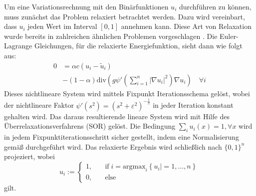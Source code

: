 Um eine Variationsrechnung mit den Binärfunktionen $u_i$ durchführen zu können, muss zunächst das Problem relaxiert
betrachtet werden. Dazu wird vereinbart, dass $u_i$ jeden Wert im Interval $[0,1]$ annehmen kann. Diese Art von Relaxation wurde bereits in zahlreichen
ähnlichen Problemen vorgeschlagen \cite{008,018,014}. Die Euler-Lagrange Gleichungen, für die relaxierte Energiefunktion, sieht dann wie folgt aus:
\begin{equation}
  \begin{split}
    0 & = \alpha c (u_i - \tilde u_i) \\
    & - (1-\alpha) \mathrm{div}\left( g \psi' \left( \sum \limits_{i=1}^n \left| \nabla u_i \right|^2 \right) \nabla u_i \right) \quad \forall i
  \end{split}
\label{eq:lag1}
\end{equation}
Dieses nichtlineare System wird mittels Fixpunkt Iterationsschema gelöst, wobei der nichtlineare Faktor $\psi'(s^2) = (s^2 + \varepsilon^2)^{-\frac{1}{2}}$
in jeder Iteration konstant gehalten wird. Das daraus resultierende lineare System wird mit Hilfe des Überrelaxationsverfahrens (SOR) gelöst.
Die Bedingung $\sum_i u_i(x) = 1, \forall x$ wird in jedem Fixpunktiterationsschritt sicher gestellt, indem eine Normalisierung gemäß \cite{009}
durchgeführt wird. Das relaxierte Ergebnis wird schließlich nach $\{0,1\}^n$ projeziert, wobei
\begin{equation}
  u_i := \left\{
    \begin{split}
      1, & \quad \mathrm{if}\; i = \mathrm{argmax}_i\left\{u_i|=1,\dotsc,n\right\} \\
      0, & \quad \mathrm{else }
    \end{split} \right.
\end{equation}
gilt.


